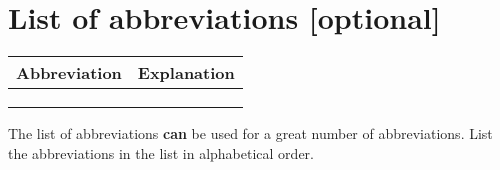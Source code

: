 \chapter{List of abbreviations [optional]}
\label{sec: Abbreviations}

\begin{table}[h]
	\centering
	\begin{tabular}{|p{3cm}|p{11.6cm}|}
		\hline
		\rowcolor{lightgray}\textbf{Abbreviation} & \textbf{Explanation} \\
		\hline
		& \\ 
		\hline
		& \\ 
		\hline
		& \\ 
		\hline
	\end{tabular}
\end{table}

\noindent The list of abbreviations \textbf{can} be used for a great number of abbreviations. List the abbreviations in the list in alphabetical order.

 
 


